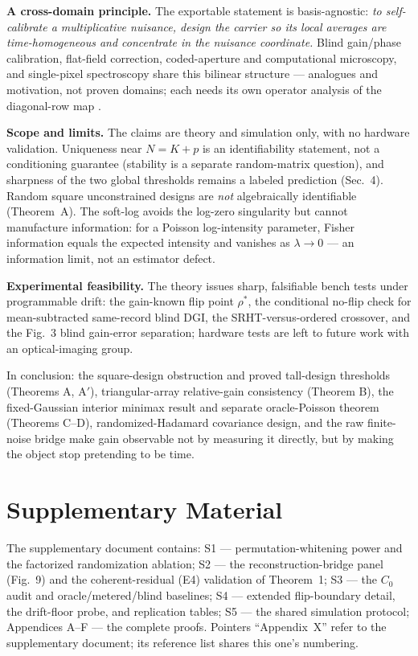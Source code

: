 \noindent\textbf{A cross-domain principle.} The exportable statement is basis-agnostic: \emph{to self-calibrate a multiplicative nuisance, design the carrier so its local averages are time-homogeneous and concentrate in the nuisance coordinate.} Blind gain/phase calibration, flat-field correction, coded-aperture and computational microscopy, and single-pixel spectroscopy share this bilinear structure --- analogues and motivation, not proven domains; each needs its own operator analysis of the diagonal-row map \cite{LiLeeBresler1501.06120,KechKrahmer1603.07316}.

\noindent\textbf{Scope and limits.} The claims are theory and simulation only, with no hardware validation. Uniqueness near $N=K+p$ is an identifiability statement, not a conditioning guarantee (stability is a separate random-matrix question), and sharpness of the two global thresholds remains a labeled prediction (Sec.~4). Random square unconstrained designs are \emph{not} algebraically identifiable (Theorem~A). The soft-log avoids the log-zero singularity but cannot manufacture information: for a Poisson log-intensity parameter, Fisher information equals the expected intensity and vanishes as $\lambda\to0$ --- an information limit, not an estimator defect.

\noindent\textbf{Experimental feasibility.} The theory issues sharp, falsifiable bench tests under programmable drift: the gain-known flip point $\rho^*$, the conditional no-flip check for mean-subtracted same-record blind DGI, the SRHT-versus-ordered crossover, and the Fig.~3 blind gain-error separation; hardware tests are left to future work with an optical-imaging group.

In conclusion: the square-design obstruction and proved tall-design thresholds (Theorems A, A$'$), triangular-array relative-gain consistency (Theorem B), the fixed-Gaussian interior minimax result and separate oracle-Poisson theorem (Theorems C--D), randomized-Hadamard covariance design, and the raw finite-noise bridge make gain observable not by measuring it directly, but by making the object stop pretending to be time.

\section*{Supplementary Material}

The supplementary document contains: S1 --- permutation-whitening power and the factorized randomization ablation; S2 --- the reconstruction-bridge panel (Fig.~9) and the coherent-residual (E4) validation of Theorem~1; S3 --- the $C_0$ audit and oracle/metered/blind baselines; S4 --- extended flip-boundary detail, the drift-floor probe, and replication tables; S5 --- the shared simulation protocol; Appendices A--F --- the complete proofs. Pointers ``Appendix~X'' refer to the supplementary document; its reference list shares this one's numbering.

